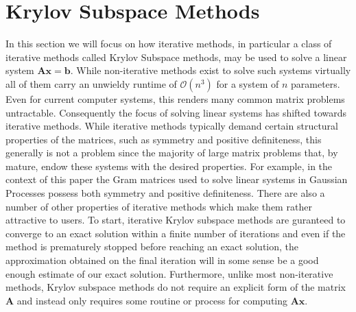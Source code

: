 \section{Krylov Subspace Methods}\label{Chapter4}
In this section we will focus on how iterative methods, in particular a class of iterative methods called Krylov Subspace methods, may be used to solve a linear system $\bm{A} \bm{x} = \bm{b}$. While non-iterative methods exist to solve such systems virtually all of them carry an unwieldy runtime of $\mathcal{O} \left( n^3 \right)$ for a system of $n$ parameters. Even for current computer systems, this renders many common matrix problems untractable. Consequently the focus of solving linear systems has shifted towards iterative methods. While iterative methods typically demand certain structural properties of the matrices, such as symmetry and positive definiteness, this generally is not a problem since the majority of large matrix problems that, by mature, endow these systems with the desired properties. For example, in the context of this paper the Gram matrices used to solve linear systems in Gaussian Processes possess both symmetry and positive definiteness. There are also a number of other properties of iterative methods which make them rather attractive to users. To start, iterative Krylov subspace methods are guranteed to converge to an exact solution within a finite number of iterations and even if the method is prematurely stopped before reaching an exact solution, the approximation obtained on the final iteration will in some sense be a good enough estimate of our exact solution. Furthermore, unlike most non-iterative methods, Krylov subspace methods do not require an explicit form of the matrix $\bm{A}$ and instead only requires some routine or process for computing $\bm{A} \bm{x}$.











